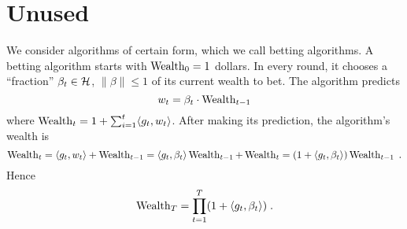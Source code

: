 \section{Unused}
We consider algorithms of certain form, which we call betting algorithms.  A
betting algorithm starts with $\operatorname{Wealth}_0 = 1$ dollars.
In every round, it chooses a ``fraction'' $\beta_t \in \mathcal{H}$, $\|\beta\| \le 1$
of its current wealth to bet. The algorithm predicts
$$
w_t = \beta_t \cdot \operatorname{Wealth}_{t-1}
$$
where $\operatorname{Wealth}_t = 1 + \sum_{i=1}^t \langle g_t, w_t \rangle$. After making its prediction,
the algorithm's wealth is
$$
\operatorname{Wealth}_t = \langle g_t, w_t \rangle + \operatorname{Wealth}_{t-1} = \langle g_t, \beta_t \rangle \operatorname{Wealth}_{t-1} + \operatorname{Wealth}_t = (1 + \langle g_t, \beta_t \rangle) \operatorname{Wealth}_{t-1} \; .
$$
Hence
$$
\operatorname{Wealth}_T = \prod_{t=1}^T (1 + \langle g_t, \beta_t \rangle) \; .
$$


